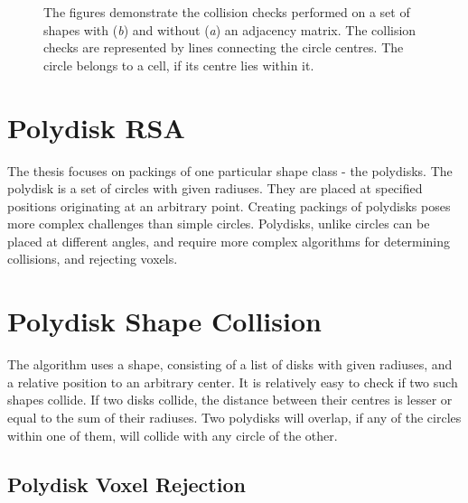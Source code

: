 \documentclass[12pt, oneside]{report}
\begin{document}
\begin{figure}[H]
\caption{The figures demonstrate the collision checks performed on a set of shapes with (\textit{b}) and without (\textit{a}) an adjacency matrix. The collision checks are represented by lines connecting the circle centres. The circle belongs to a cell, if its centre lies within it.}
\end{figure}

\section{Polydisk RSA}

The thesis focuses on packings of one particular shape class - the polydisks. The polydisk is a set of circles with given radiuses. They are placed at specified positions originating at an arbitrary point. \newline
Creating packings of polydisks poses more complex challenges than simple circles. Polydisks, unlike circles can be placed at different angles, and require more complex algorithms for determining collisions, and rejecting voxels.

\section{Polydisk Shape Collision}

The algorithm uses a shape, consisting of a list of disks with given radiuses, and a relative position to an arbitrary center. It is relatively easy to check if two such shapes collide. \newline
If two disks collide, the distance between their centres is lesser or equal to the sum of their radiuses. Two polydisks will overlap, if any of the circles within one of them, will collide with any circle of the other.

\subsection{Polydisk Voxel Rejection}
\end{document}

